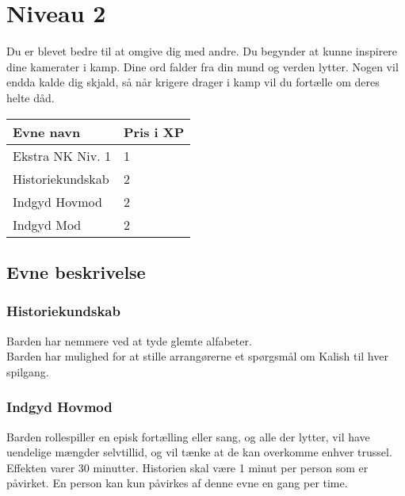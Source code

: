 \chapter*{Niveau 2}
Du er blevet bedre til at omgive dig med andre. Du begynder at kunne inspirere dine kamerater i kamp. Dine ord falder fra din mund og verden lytter. Nogen vil endda kalde dig skjald, så når krigere drager i kamp vil du fortælle om deres helte dåd.
\begin{table}[H]
    \centering
    \begin{tabular}{|p{}|p{}|}
    \rowcolor{cerulean!80}\hline
    Evne navn & Pris i XP \\\hline
       Ekstra NK Niv. 1 & 1 \\\hline
       Historiekundskab & 2 \\\hline
       Indgyd Hovmod & 2 \\\hline
       Indgyd Mod & 2 \\\hline
    \end{tabular}
\end{table}
\section*{Evne beskrivelse}



\subsection*{Historiekundskab}
Barden har nemmere ved at tyde glemte alfabeter.\\
Barden har mulighed for at stille arrangørerne et spørgsmål om Kalish til hver spilgang.

\subsection*{Indgyd Hovmod}
Barden rollespiller en episk fortælling eller sang, og alle der lytter, vil have uendelige mængder selvtillid, og vil tænke at de kan overkomme enhver trussel. Effekten varer 30 minutter. Historien skal være 1 minut per person som er påvirket. En person kan kun påvirkes af denne evne en gang per time.

